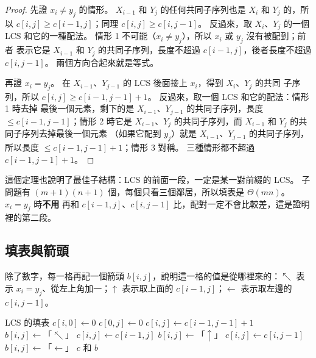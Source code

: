 \begin{proof}
先證 $x_i \ne y_j$ 的情形。 $X_{i-1}$ 和 $Y_j$ 的任何共同子序列也是 $X_i$ 和 $Y_j$ 的，所以
$c[i, j] \ge c[i - 1, j]$；同理 $c[i, j] \ge c[i, j - 1]$。 反過來，取 $X_i$、$Y_j$ 的一個
LCS 和它的一種配法。 情形 1 不可能（$x_i \ne y_j$），所以 $x_i$ 或 $y_j$ 沒有被配到；前者
表示它是 $X_{i-1}$ 和 $Y_j$ 的共同子序列，長度不超過 $c[i-1, j]$，後者長度不超過
$c[i, j-1]$。 兩個方向合起來就是等式。

再證 $x_i = y_j$。 在 $X_{i-1}$、$Y_{j-1}$ 的 LCS 後面接上 $x_i$，得到 $X_i$、$Y_j$ 的共同
子序列，所以 $c[i, j] \ge c[i-1, j-1] + 1$。 反過來，取一個 LCS 和它的配法：情形 1 時去掉
最後一個元素，剩下的是 $X_{i-1}$、$Y_{j-1}$ 的共同子序列，長度 $\le c[i-1, j-1]$；情形 2
時它是 $X_{i-1}$、$Y_j$ 的共同子序列，而 $X_{i-1}$ 和 $Y_j$ 的共同子序列去掉最後一個元素
（如果它配到 $y_j$）就是 $X_{i-1}$、$Y_{j-1}$ 的共同子序列，所以長度
$\le c[i-1, j-1] + 1$；情形 3 對稱。 三種情形都不超過 $c[i-1, j-1] + 1$。
\end{proof}

這個定理也說明了最佳子結構：LCS 的前面一段，一定是某一對前綴的 LCS。 子問題有
$(m+1)(n+1)$ 個，每個只看三個鄰居，所以填表是 $\Theta(mn)$。 $x_i = y_j$ 時\textbf{不用}
再和 $c[i-1, j]$、$c[i, j-1]$ 比，配對一定不會比較差，這是證明裡的第二段。

\subsection{填表與箭頭}

除了數字，每一格再記一個箭頭 $b[i, j]$，說明這一格的值是從哪裡來的：$\nwarrow$ 表示
$x_i = y_j$、從左上角加一；$\uparrow$ 表示取上面的 $c[i-1, j]$；$\leftarrow$ 表示取左邊的
$c[i, j-1]$。

\begin{pseudo}[label=alg:dp-lcs-length]{LCS 的填表}
        \State $c[i, 0] \gets 0$
    \EndFor
        \State $c[0, j] \gets 0$
    \EndFor
                \State $c[i, j] \gets c[i - 1, j - 1] + 1$
                \State $b[i, j] \gets \text{「}\nwarrow\text{」}$
                \State $c[i, j] \gets c[i - 1, j]$
                \State $b[i, j] \gets \text{「}\uparrow\text{」}$
            \Else
                \State $c[i, j] \gets c[i, j - 1]$
                \State $b[i, j] \gets \text{「}\leftarrow\text{」}$
            \EndIf
        \EndFor
    \EndFor
    \State \Return $c$ 和 $b$
\EndFunction
\end{pseudo}

